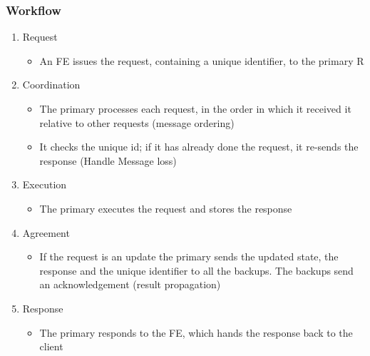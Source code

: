 \documentclass{article}[18pt]
\begin{document}
\subsubsection{Workflow}
\begin{enumerate}
	\item Request
	\begin{itemize}
		\item An FE issues the request, containing a unique identifier, to the primary R
	\end{itemize}
	\item Coordination
	\begin{itemize}
		\item The primary processes each request, in the order in which it received it relative to other requests (message ordering)
		\item It checks the unique id; if it has already done the request, it re-sends the response (Handle Message loss)
	\end{itemize}
	\item Execution
	\begin{itemize}
		\item The primary executes the request and stores the response
	\end{itemize}
	\item Agreement
	\begin{itemize}
		\item If the request is an update the primary sends the updated state, the response and the unique identifier to all the backups. The backups send an acknowledgement (result propagation)
	\end{itemize}
	\item Response
	\begin{itemize}
		\item The primary responds to the FE, which hands the response back to the client
	\end{itemize}
\end{enumerate}
\end{document}
